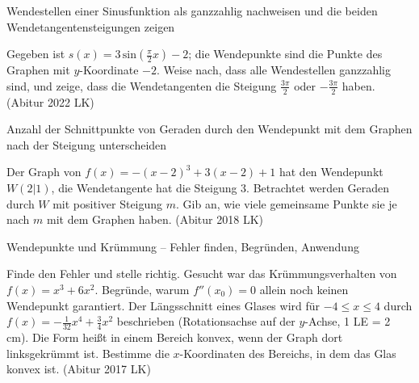 \begin{aufgabe}{Wendestellen einer Sinusfunktion als ganzzahlig nachweisen und die beiden Wendetangentensteigungen zeigen}
\begin{teile}
\teil Gegeben ist $s(x) = 3\,\mathrm{sin}\left(\frac{\pi}{2}x\right) - 2$; die Wendepunkte sind die Punkte des Graphen mit $y$-Koordinate $-2$. Weise nach, dass alle Wendestellen ganzzahlig sind, und zeige, dass die Wendetangenten die Steigung $\frac{3\pi}{2}$ oder $-\frac{3\pi}{2}$ haben. \hfill (Abitur 2022 LK)
\end{teile}
\end{aufgabe}

\begin{aufgabe}{Anzahl der Schnittpunkte von Geraden durch den Wendepunkt mit dem Graphen nach der Steigung unterscheiden}
\begin{teile}
\teil Der Graph von $f(x) = -(x - 2)^3 + 3(x - 2) + 1$ hat den Wendepunkt $W(2 | 1)$, die Wendetangente hat die Steigung $3$. Betrachtet werden Geraden durch $W$ mit positiver Steigung $m$. Gib an, wie viele gemeinsame Punkte sie je nach $m$ mit dem Graphen haben. \hfill (Abitur 2018 LK)
\end{teile}
\end{aufgabe}

\begin{aufgabe}{Wendepunkte und Krümmung – Fehler finden, Begründen, Anwendung}
\begin{teile}
\teil Finde den Fehler und stelle richtig. Gesucht war das Krümmungsverhalten von $f(x) = x^3 + 6x^2$. 
\teil Begründe, warum $f''(x_0) = 0$ allein noch keinen Wendepunkt garantiert.
\teil Der Längsschnitt eines Glases wird für $-4 \le x \le 4$ durch $f(x) = -\frac{1}{32}x^4 + \frac{3}{4}x^2$ beschrieben (Rotationsachse auf der $y$-Achse, 1 LE = 2 cm). Die Form heißt in einem Bereich konvex, wenn der Graph dort linksgekrümmt ist. Bestimme die $x$-Koordinaten des Bereichs, in dem das Glas konvex ist. \hfill (Abitur 2017 LK)
\end{teile}
\end{aufgabe}
